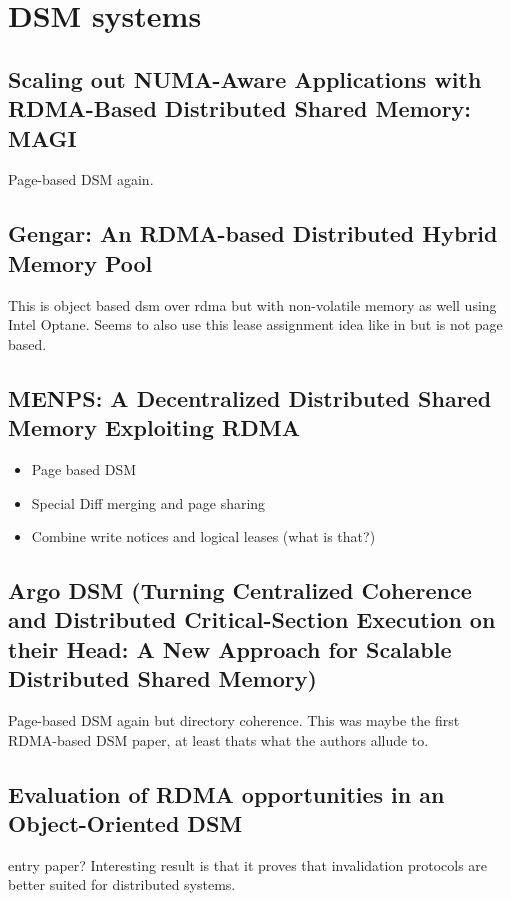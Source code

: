 \documentclass[sigplan,nonacm]{acmart}
\begin{document}

\section {DSM systems}

    \subsection{Scaling out NUMA-Aware Applications with RDMA-Based Distributed Shared Memory: MAGI}
    Page-based DSM again. \cite{Hong-JCST-2019}

    \subsection{Gengar: An RDMA-based Distributed Hybrid Memory Pool}
    This is object based dsm over rdma but with non-volatile memory as well using Intel Optane. Seems to 
    also use this lease assignment idea like in \cite{Endo-IPDRM-2020} but is not page based.\cite{Duan-ICDCS-2021}

    \subsection{MENPS: A Decentralized Distributed Shared Memory Exploiting RDMA}
    \begin{itemize}
        \item Page based DSM
        \item Special Diff merging and page sharing
        \item Combine write notices and logical leases (what is that?)\cite{Endo-IPDRM-2020}
    \end{itemize}

    \subsection{Argo DSM (Turning Centralized Coherence and Distributed Critical-Section Execution on their Head: A New Approach for Scalable Distributed Shared Memory)}
    Page-based DSM again but directory coherence. This was maybe the first RDMA-based DSM paper, 
    at least thats what the authors allude to.\cite{Kaxiras-HPDC-2015}

    \subsection{Evaluation of RDMA opportunities in an Object-Oriented DSM}
    entry paper? Interesting result is that it proves that invalidation protocols are better suited 
    for distributed systems. \cite{Veldema-LCPC-2007}
\end{document}
